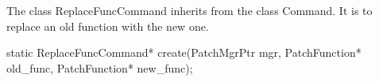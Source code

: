 
The class ReplaceFuncCommand inherits from the class Command. It is to replace
an old function with the new one.


\begin{apient}
static ReplaceFuncCommand* create(PatchMgrPtr mgr, PatchFunction* old_func,
                                  PatchFunction* new_func);
\end{apient}


